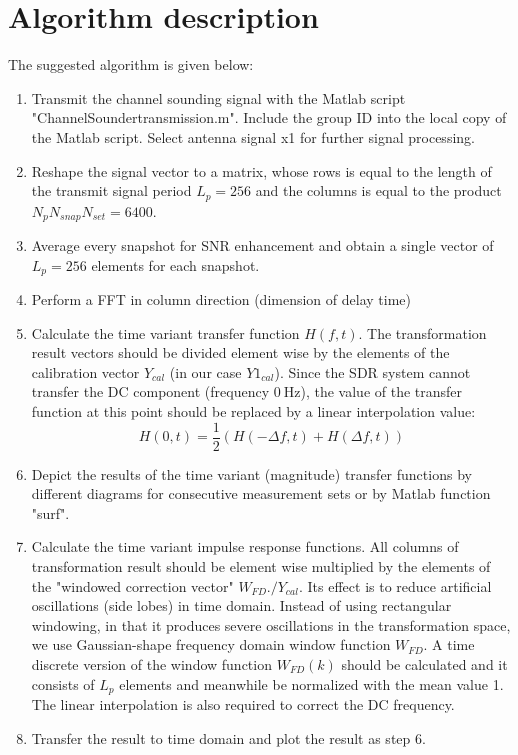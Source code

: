 \section{Algorithm description \cite{e5}}
The suggested algorithm is given below:
\begin{enumerate}
	\item Transmit the channel sounding signal with the Matlab script "ChannelSoundertransmission.m". Include the group ID into the local copy of the Matlab script. Select antenna signal x1 for further signal processing.
	\item Reshape the signal vector to a matrix, whose rows is equal to the length of the transmit signal period $L_p = 256$ and the columns is equal to the product $N_p N_{snap} N_{set} = 6400$.
	\item Average every snapshot for SNR enhancement and obtain a single vector of $L_p = 256$ elements for each snapshot.
	\item Perform a FFT in column direction (dimension of delay time)
	\item Calculate the time variant transfer function $H(f,t)$. The transformation result vectors should be divided element wise by the elements of the calibration vector $Y_{cal}$ (in our case $Y1_{cal}$). Since the SDR system cannot transfer the DC component (frequency $\SI{0}{\hertz}$), the value of the transfer function at this point should be replaced by a linear interpolation value:
	$$ H(0,t) = \frac{1}{2} \left( H(-\Delta f,t)+ H(\Delta f,t) \right) $$
	\item Depict the results of the time variant (magnitude) transfer functions by different diagrams for consecutive measurement sets or by Matlab function "surf".
	\item Calculate the time variant impulse response functions. All columns of transformation result should be element wise multiplied by the elements of the "windowed correction vector" $W_{FD}./Y_{cal}$. Its effect is to reduce artificial oscillations (side lobes) in time domain. Instead of using rectangular windowing, in that it produces severe oscillations in the transformation space, we use Gaussian-shape frequency domain window function $W_{FD}$. A time discrete version of the window function $W_{FD}(k)$ should be calculated and it consists of $L_p$ elements and meanwhile be normalized with the mean value 1. The linear interpolation is also required to correct the DC frequency.
	\item Transfer the result to time domain and plot the result as step 6.

\end{enumerate}
